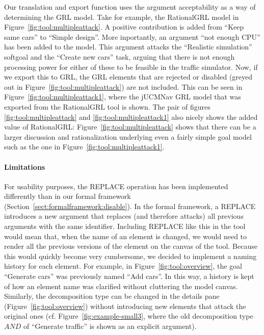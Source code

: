 Our translation and export function uses the argument acceptability as a way of determining the GRL model. Take for example, the RationalGRL model in Figure~\ref{fig:tool:multipleattack}. A positive contribution is added from ``Keep same cars'' to ``Simple design''. More inportantly, an argument ``not enough CPU'' has been added to the model. This argument attacks the ``Realistic simulation'' softgoal and the ``Create new cars'' task, arguing that there is not enough processing power for either of these to be feasible in the traffic simulator. Now, if we export this to GRL, the GRL elements that are rejected or disabled (greyed out in Figure~\ref{fig:tool:multipleattack}) are not included. This can be seen in Figure~\ref{fig:tool:multipleattack1}, where the jUCMNav GRL model that was exported from the RationalGRL tool is shown. The pair of figures \ref{fig:tool:multipleattack} and \ref{fig:tool:multipleattack1} also nicely shows the added value of RationalGRL: Figure~\ref{fig:tool:multipleattack} shows that there can be a larger discussion and rationalization underlying even a fairly simple goal model such as the one in Figure~\ref{fig:tool:multipleattack1}. 

\paragraph{Limitations}
For usability purposes, the \textsf{REPLACE} operation has been implemented differently than in our formal framework (Section~\ref{sect:formalframework:disable}). In the formal framework, a \textsf{REPLACE} introduces a new argument that replaces (and therefore attacks) all previous arguments with the same identifier. Including \textsf{REPLACE} like this in the tool would mean that, when the name of an element is changed, we would need to render all the previous versions of the element on the canvas of the tool. Because this would quickly become very cumbersome, we decided to implement a naming history for each element. For example, in Figure~\ref{fig:tool:overview}, the goal ``Generate cars'' was previously named ``Add cars''. In this way, a history is kept of how an element name was clarified without cluttering the model canvas. Similarly, the decomposition type can be changed in the details pane (Figure~\ref{fig:tool:overview}) without introducing new elements that attack the original ones (cf. Figure~\ref{fig:example-small3}, where the old decomposition type $AND$ of ``Generate traffic'' is shown as an explicit argument).